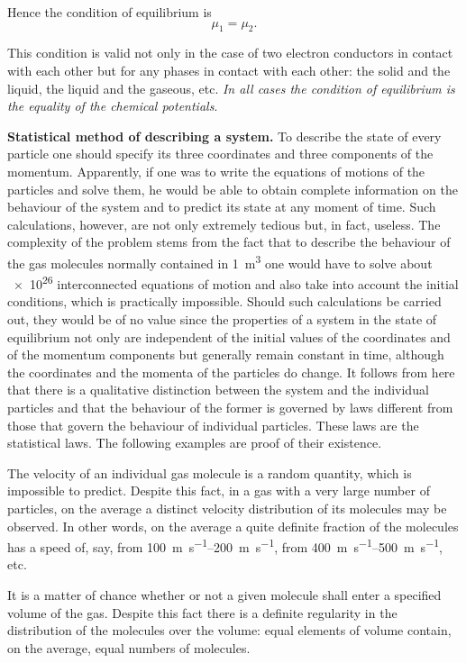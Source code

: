 \noindent
Hence the condition of equilibrium is
\begin{equation}\label{eq:3_9}
    \mu_1 = \mu_2.
\end{equation}

\noindent
This condition is valid not only in the case of two electron conductors in contact with each other but for any phases in contact with each other: the solid and the liquid, the liquid and the gaseous, etc. \textit{In all cases the condition of equilibrium is the equality of the chemical potentials}.

\textbf{Statistical method of describing a system.} To describe the state of every particle one should specify its three coordinates and three components of the momentum. Apparently, if one was to write the equations of motions of the particles and solve them, he would be able to obtain complete information on the behaviour of the system and to predict its state at any moment of time. Such calculations, however, are not only extremely tedious but, in fact, useless. The complexity of the problem stems from the fact that to describe the behaviour of the gas molecules normally contained in \SI{1}{\metre\cubed} one would have to solve about \num{e26} interconnected equations of motion and also take into account the initial conditions, which is practically impossible. Should such calculations be carried out, they would be of no value since the properties of a system in the state of equilibrium not only are independent of the initial values of the coordinates and of the momentum components but generally remain constant in time, although the coordinates and the momenta of the particles do change. It follows from here that there is a qualitative distinction between the system and the individual particles and that the behaviour of the former is governed by laws different from those that govern the behaviour of individual particles. These laws are the statistical laws. The following examples are proof of their existence.

The velocity of an individual gas molecule is a random quantity, which is impossible to predict. Despite this fact, in a gas with a very large number of particles, on the average a distinct velocity distribution of its molecules may be observed. In other words, on the average a quite definite fraction of the molecules has a speed of, say, from \SIrange{100}{200}{\metre\per\second}, from \SIrange{400}{500}{\metre\per\second}, etc.

It is a matter of chance whether or not a given molecule shall enter a specified volume of the gas. Despite this fact there is a definite regularity in the distribution of the molecules over the volume: equal elements of volume contain, on the average, equal numbers of molecules.

